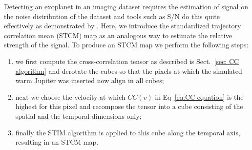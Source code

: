 \documentclass{aa}
\begin{document}
Detecting an exoplanet in an imaging dataset requires the estimation of signal on the noise distribution of the dataset and tools such as S/N do this quite effectively as demonstrated by \citet{2014MawetSNR}.
Here, we introduce the standardized trajectory correlation mean (STCM) map as an analogous way to estimate the relative strength of the signal. To produce an STCM map we perform the following steps:
\begin{enumerate}
    \item we first compute the cross-correlation tensor as described is Sect.~\ref{sec: CC algorithm} and derotate the cubes so that the pixels at which the simulated warm Jupiter was inserted now align in all cubes;
    \item next we choose the velocity at which $CC(v)$ in Eq~\ref{eq:CC equation} is the highest for this pixel and recompose the tensor into a cube consisting of the spatial and the temporal dimensions only;
    \item finally the STIM algorithm is applied to this cube along the temporal axis, resulting in an STCM map.
\end{enumerate}
\end{document}
